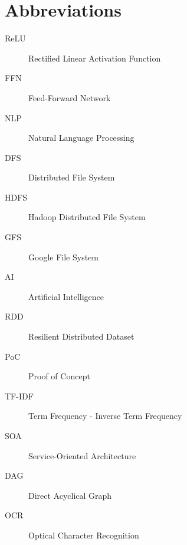 \documentclass[\main/main.tex]{subfiles}
\begin{document}
\chapter*{Abbreviations}

\begin{description}
    \item[ReLU] Rectified Linear Activation Function
    \item[FFN] Feed-Forward Network
    \item[NLP] Natural Language Processing
    \item[DFS] Distributed File System
    \item[HDFS] Hadoop Distributed File System
    \item[GFS] Google File System
    \item[AI] Artificial Intelligence
    \item[RDD] Resilient Distributed Dataset
    \item[PoC] Proof of Concept
    \item[TF-IDF] Term Frequency - Inverse Term Frequency
    \item[SOA] Service-Oriented Architecture
    \item[DAG] Direct Acyclical Graph
    \item[OCR] Optical Character Recognition
\end{description}
\end{document}
